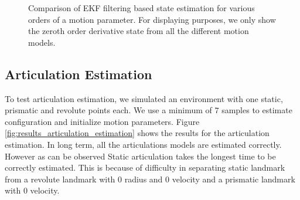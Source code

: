 \documentclass[conference]{IEEEtran}
\begin{document}
\begin{figure}
\caption{Comparison of EKF filtering based state estimation for various orders of a motion parameter. For displaying purposes, we only show the zeroth order derivative state from all the different motion models.}
\label{fig:order_model}
\end{figure}

\subsection{Articulation Estimation}
To test articulation estimation, we simulated an environment with one static, prismatic and revolute points each. We use a minimum of $7$ samples to estimate configuration and initialize motion parameters. Figure \ref{fig:results_articulation_estimation} shows the results for the articulation estimation. In long term, all the articulations models are estimated correctly. However as can be observed Static articulation takes the longest time to be correctly estimated. This is because of difficulty in separating static landmark from a revolute landmark with $0$ radius and $0$ velocity and a prismatic landmark with $0$ velocity. 
\end{document}
